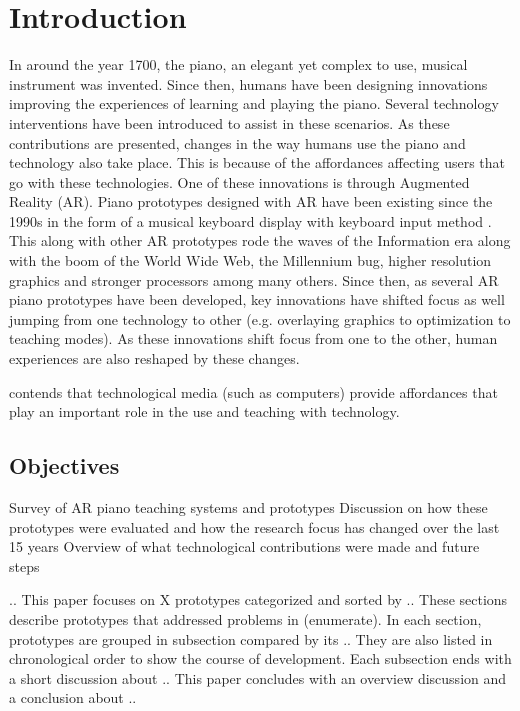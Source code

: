 \documentclass[manuscript,screen]{acmart}
\begin{document}
\section{Introduction}
In around the year 1700, the piano, an elegant yet complex to use, musical instrument was invented. Since then, humans have been designing innovations improving the experiences of learning and playing the piano. Several technology interventions have been introduced to assist in these scenarios. As these contributions are presented, changes in the way humans use the piano and technology also take place. This is because of the affordances affecting users that go with these technologies. One of these innovations is through Augmented Reality (AR). Piano prototypes designed with AR have been existing since the 1990s in the form of a musical keyboard display with keyboard input method \cite{breitweiser1996musical}. This along with other AR prototypes rode the waves of the Information era along with the boom of the World Wide Web, the Millennium bug, higher resolution graphics and stronger processors among many others. Since then, as several AR piano prototypes have been developed, key innovations have shifted focus as well jumping from one technology to other (e.g. overlaying graphics to optimization to teaching modes). As these innovations shift focus from one to the other, human experiences are also reshaped by these changes. 

\citet{dede1996evolution} contends that technological media (such as computers) provide affordances that play an important role in the use and teaching with technology. 


\subsection{Objectives}

Survey of AR piano teaching systems and prototypes
Discussion on how these prototypes were evaluated and how the research focus has changed over the last 15 years
Overview of what technological contributions were made and future steps 

.. This paper focuses on X prototypes categorized and sorted by .. These sections describe prototypes that addressed problems in (enumerate). In each section, prototypes are grouped in subsection compared by its .. They are also listed in chronological order to show the course of development. Each subsection ends with a short discussion about .. This paper concludes with an overview discussion and a conclusion about ..
\end{document}
